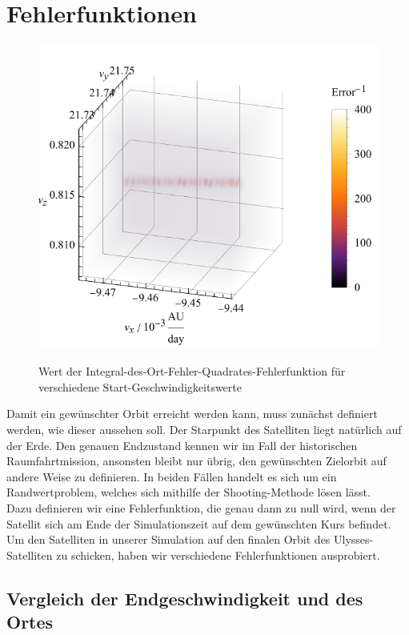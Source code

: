 \section{Fehlerfunktionen}
\begin{figure}[h!]
	\centering
	\includegraphics{img/gridSearch.pdf}
	\label{fig:gridSearch}
	\caption{Wert der Integral-des-Ort-Fehler-Quadrates-Fehlerfunktion für verschiedene Start-Geschwindigkeitswerte}
\end{figure}

Damit ein gewünschter Orbit erreicht werden kann, muss zunächst definiert werden, wie dieser aussehen soll. Der Starpunkt des Satelliten liegt natürlich auf der Erde. Den genauen Endzustand kennen wir im Fall der historischen Raumfahrtmission, ansonsten bleibt nur übrig, den gewünschten Zielorbit auf andere Weise zu definieren. In beiden Fällen handelt es sich um ein Randwertproblem, welches sich mithilfe der Shooting-Methode lösen lässt.\\
Dazu definieren wir eine Fehlerfunktion, die genau dann zu null wird, wenn der Satellit sich am Ende der Simulationszeit auf dem gewünschten Kurs befindet.
Um den Satelliten in unserer Simulation auf den finalen Orbit des Ulysses-Satelliten zu schicken, haben wir verschiedene Fehlerfunktionen ausprobiert.


\subsection{Vergleich der Endgeschwindigkeit und des Ortes}

